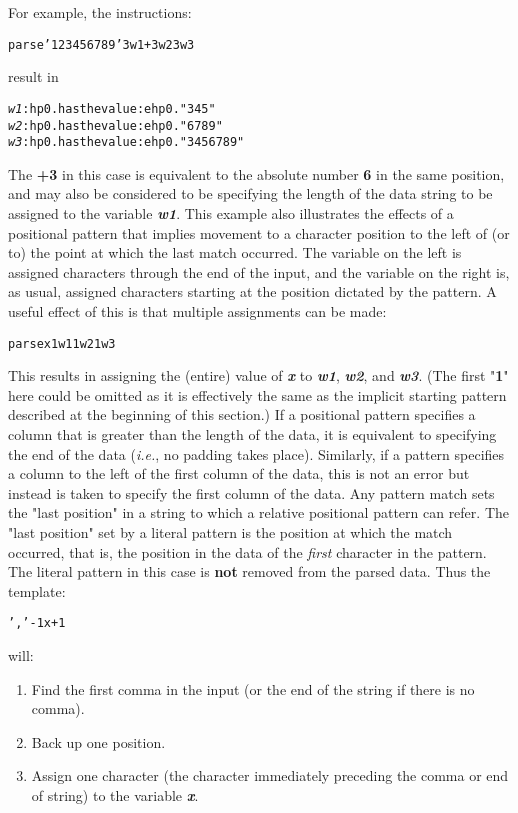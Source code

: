 For example, the instructions:
\begin{alltt}
parse '123456789'  3 w1 +3 w2 3 w3
\end{alltt}
result in
\begin{alltt}
\emph{w1} :hp0.has the value:ehp0. "345"
\emph{w2} :hp0.has the value:ehp0. "6789"
\emph{w3} :hp0.has the value:ehp0. "3456789"
\end{alltt}
The \textbf{+3} in this case is equivalent to the absolute
number \textbf{6} in the same position, and may also be considered to
be specifying the length of the data string to be assigned to the
variable \textbf{\emph{w1}}.
 This example also illustrates the effects of a positional pattern
that implies movement to a character position to the left of (or to)
the point at which the last match occurred.
The variable on the left is assigned characters through the end of the
input, and the variable on the right is, as usual, assigned characters
starting at the position dictated by the pattern.
 A useful effect of this is that multiple assignments can be made:
\begin{alltt}
parse x 1 w1 1 w2 1 w3
\end{alltt}
This results in assigning the (entire) value
of \textbf{\emph{x}}
to \textbf{\emph{w1}}, \textbf{\emph{w2}},
and \textbf{\emph{w3}}.
(The first "\textbf{1}" here could be omitted as it is
effectively the same as the implicit starting pattern described at the
beginning of this section.)
 If a positional pattern specifies a column that is greater than the
length of the data, it is equivalent to specifying the end of the data
(\emph{i.e.}, no padding takes place).
Similarly, if a pattern specifies a column to the left of the first
column of the data, this is not an error but instead is taken to
specify the first column of the data.
 Any pattern match sets the "last position" in a string to which
a relative positional pattern can refer.
The "last position" set by a literal pattern is the position at
which the match occurred, that is, the position in the data of the
\emph{first} character in the pattern.
The literal pattern in this case is \textbf{not} removed from the
parsed data.
Thus the template:
\begin{alltt}
',' -1 x +1
\end{alltt}
 will:
\begin{enumerate}
\item Find the first comma in the input (or the end of the string if
there is no comma).
\item Back up one position.
\item Assign one character (the character immediately preceding the comma
or end of string) to the variable \textbf{\emph{x}}.
\end{enumerate}
